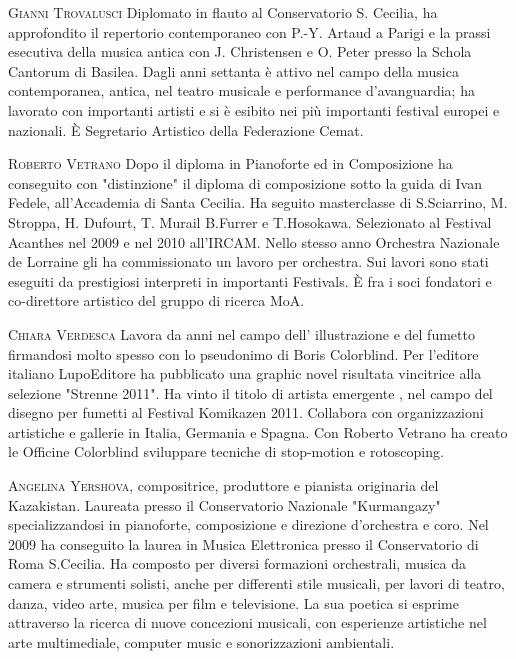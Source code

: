 \documentclass[9pt, twoside, a5paper]{extreport}
\newcommand{\biografia}[2]{%
\noindent \textsc{#1} %
#2 %
\medskip
}%
\begin{document}
\begin{multicols}{2}
\biografia{Gianni Trovalusci}{Diplomato in flauto al Conservatorio S. Cecilia, ha approfondito il repertorio contemporaneo con P.-Y. Artaud a Parigi e la prassi esecutiva della musica antica con J. Christensen e O. Peter presso la Schola Cantorum di Basilea. Dagli anni settanta è attivo nel campo della musica contemporanea, antica, nel teatro musicale e performance d'avanguardia; ha lavorato con importanti artisti e si è esibito nei più importanti festival europei e nazionali. È Segretario Artistico della Federazione Cemat.}

\biografia{Roberto Vetrano}{Dopo il diploma in Pianoforte ed in Composizione ha conseguito con "distinzione" il diploma di composizione sotto la guida di Ivan Fedele, all'Accademia di Santa Cecilia. Ha seguito masterclasse di S.Sciarrino, M. Stroppa, H. Dufourt, T. Murail B.Furrer e T.Hosokawa. Selezionato al Festival Acanthes nel 2009 e nel 2010 all'IRCAM. Nello stesso anno Orchestra Nazionale de Lorraine gli ha commissionato un lavoro per orchestra. Sui lavori sono stati eseguiti da prestigiosi interpreti in importanti Festivals. È fra i soci fondatori e co-direttore artistico del gruppo di ricerca MoA.}

\biografia{Chiara Verdesca}{Lavora da anni nel campo dell' illustrazione e del fumetto firmandosi molto spesso con lo pseudonimo di Boris Colorblind. Per l'editore italiano LupoEditore ha pubblicato una graphic novel risultata vincitrice alla selezione "Strenne 2011". Ha vinto il titolo di artista emergente , nel campo del disegno per fumetti al Festival Komikazen 2011. Collabora con organizzazioni artistiche e gallerie in Italia, Germania e Spagna. Con Roberto Vetrano ha creato le Officine Colorblind sviluppare tecniche di stop-motion e rotoscoping.}

\biografia{Angelina Yershova,}{compositrice, produttore e pianista originaria del Kazakistan. Laureata presso il Conservatorio Nazionale "Kurmangazy" specializzandosi in pianoforte, composizione e direzione d'orchestra e coro. Nel 2009 ha conseguito la laurea in Musica Elettronica presso il Conservatorio di Roma S.Cecilia. Ha composto per diversi formazioni orchestrali, musica da camera e strumenti solisti, anche per differenti stile musicali, per lavori di teatro, danza, video arte, musica per film e televisione. La sua poetica si esprime attraverso la ricerca di nuove concezioni musicali, con esperienze artistiche nel arte multimediale, computer music e sonorizzazioni ambientali.}




\end{multicols}
\end{document}
